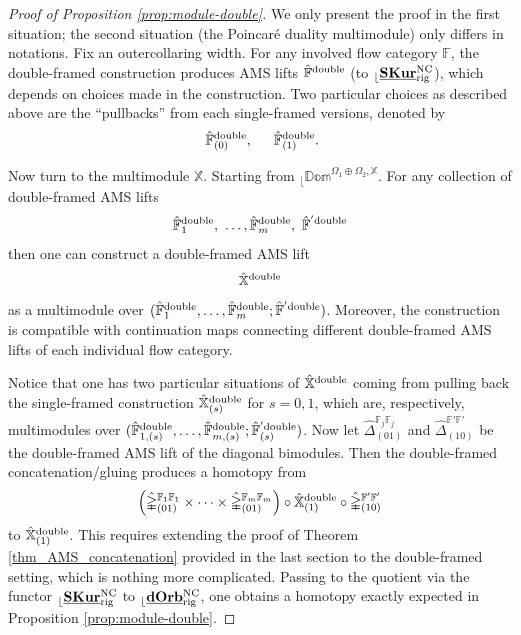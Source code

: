 \documentclass[reqno, 10pt]{amsart}
\numberwithin{equation}{section}
\numberwithin{equation}{section}
\theoremstyle{definition}
\theoremstyle{remark}
\newcommand{\beqn}{\begin{equation*}}
\newcommand{\eeqn}{\end{equation*}}
\newcommand{\mb}{\mathbb}
\renewcommand{\outer}{{}_{\lfloor}}
\newcommand{\uds}[1]{\underline{\smash{#1}}}
\begin{document}
\begin{proof}[Proof of Proposition \ref{prop:module-double}]
We only present the proof in the first situation; the second situation (the Poincar\'e duality multimodule) only differs in notations. Fix an outercollaring width. For any involved flow category ${\mb F}$, the double-framed construction produces AMS lifts $\hat {\mb F}^{\rm double}$ (to $\outer \uds{\bf SKur}^{\rm NC}_{\rm rig}$), which depends on choices made in the construction. Two particular choices as described above are the ``pullbacks'' from each single-framed versions, denoted by 
\begin{align*}
&\ \hat {\mb F}_{(0)}^{{\rm double}},\ &\ \hat {\mb F}_{(1)}^{{\rm double}}.
\end{align*}

Now turn to the multimodule ${\mb X}$. Starting from $\outer \mb{Dom}^{\Omega_1 \oplus \Omega_2, {\mb X}}$. For any collection of double-framed AMS lifts
\beqn
\hat {\mb F}_1^{\rm double},\ \ldots, \hat {\mb F}_m^{\rm double},\ \hat {\mb F}^{'{\rm double}}
\eeqn
then one can construct a double-framed AMS lift 
\beqn
\hat {\mb X}^{\rm double}
\eeqn
as a multimodule over $(\hat {\mb F}_1^{\rm double},\ldots, \hat{\mb F}_m^{\rm double}; \hat {\mb F}^{'{\rm double}})$. Moreover, the construction is compatible with continuation maps connecting different double-framed AMS lifts of each individual flow category. 

Notice that one has two particular situations of $\hat {\mb X}^{\rm double}$ coming from pulling back the single-framed construction $\hat {\mb X}^{\rm double}_{(s)}$ for $s = 0, 1$, which are, respectively, multimodules over $(\hat {\mb F}_{1, (s)}^{{\rm double}},\ldots, \hat {\mb F}_{m, (s)}^{\rm double}; \hat {\mb F}^{'{\rm double}}_{(s)})$. Now let $\hat{\mb\Delta}^{{\mb F}_j\mb{F}_j}_{(01)}$ and $\hat{\mb\Delta}^{{\mb F}'{\mb F}'}_{(10)}$ be the double-framed AMS lift of the diagonal bimodules. Then the double-framed concatenation/gluing produces a homotopy from
\beqn
\left( \hat {\mb\Delta}^{{\mb F}_1{\mb F}_1}_{(01)} \times \cdots \times \hat {\mb \Delta}^{{\mb F}_m {\mb F}_m}_{(01)} \right) \circ \hat {\mb X}_{(1)}^{\rm double} \circ \hat {\mb \Delta}^{{\mb F}' {\mb F}'}_{(10)}
\eeqn
to $\hat {\mb X}_{(1)}^{\rm double}$. This requires extending the proof of Theorem \ref{thm_AMS_concatenation} provided in the last section to the double-framed setting, which is nothing more complicated. Passing to the quotient via the functor $\outer \uds{\bf SKur}^{\rm NC}_{\rm rig}$ to $\outer \uds{\bf dOrb}^{\rm NC}_{\rm rig}$, one obtains a homotopy exactly expected in Proposition \ref{prop:module-double}.
\end{proof}
\end{document}

